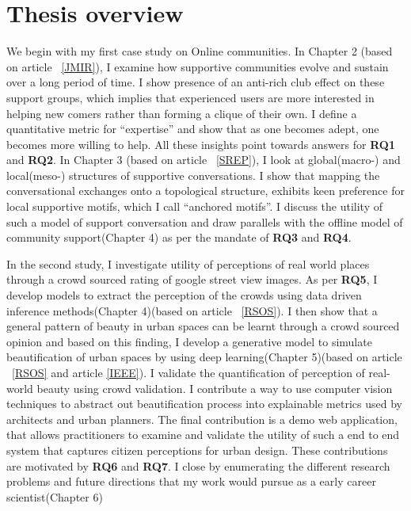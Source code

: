\section{Thesis overview}
We begin with my first case study on Online communities.
In Chapter 2 (based on article ~\ref{JMIR}), I examine how supportive communities evolve and sustain over a long period of time. I show presence of an anti-rich club effect on these support groups, which implies that experienced users are more interested in helping new comers rather than forming a clique of their own. I define a quantitative metric for ``expertise'' and show that as one becomes adept, one becomes more willing to help. All these insights point towards answers for \textbf{RQ1} and \textbf{RQ2}. In Chapter 3 (based on article ~\ref{SREP}), I look at global(macro-) and local(meso-) structures of supportive conversations. I show that mapping the conversational exchanges onto a topological structure, exhibits keen preference for local supportive motifs, which I call ``anchored motifs''. I discuss the utility of such a model of support conversation and draw parallels with the offline model of community support(Chapter 4) as per the mandate of \textbf{RQ3} and \textbf{RQ4}. 

In the second study, I investigate utility of perceptions of real world places through a crowd sourced rating of google street view images. As per \textbf{RQ5}, I develop models to extract the perception of the crowds using data driven inference methods(Chapter 4)(based on article ~\ref{RSOS}). 
I then show that a general pattern of beauty in urban spaces can be learnt through a crowd sourced opinion and based on this finding, I develop a generative model to simulate beautification of urban spaces by using deep learning(Chapter 5)(based on article ~\ref{RSOS} and article \ref{IEEE}). I validate the quantification of perception of real-world beauty using crowd validation. I contribute a way to use computer vision techniques to abstract out beautification process into explainable metrics used by architects and urban planners. The final contribution is a demo web application, that allows practitioners to examine and validate the utility of such a end to end system that captures citizen perceptions for urban design. These contributions are motivated by \textbf{RQ6} and \textbf{RQ7}. 
I close by enumerating the different research problems and future directions that my work would pursue as a early career scientist(Chapter 6)








